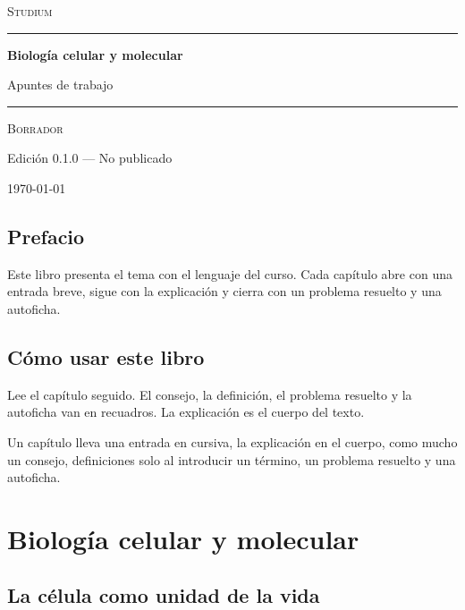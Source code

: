 \documentclass{book}
\begin{document}
\frontmatter
\ifdefined\studiumcustomtitle
\studiumcustomtitle
\else
\thispagestyle{empty}
\setlength{\parindent}{0pt}
\vspace*{0.08\textheight}
{\normalsize\scshape\color{studiumInk} Studium\par}
\vspace{0.55em}
{\color{studiumRule}\rule{\linewidth}{0.9pt}\par}
\vspace{0.16\textheight}
{\raggedright\Huge\bfseries Biología celular y molecular\par}
\vspace{0.9em}
{\raggedright\Large\color{studiumInk} Apuntes de trabajo\par}
\vfill
{\color{studiumRule}\rule{0.36\linewidth}{0.45pt}\par}
\vspace{1.05em}
{\large\scshape Borrador\par}
\vspace{0.45em}
{\normalsize Edición 0.1.0 --- No publicado\par}
\vspace{0.4em}
{\normalsize\today\par}
\vspace*{0.08\textheight}
\clearpage
\fi
\chapter{Prefacio}
\noindent Este libro presenta el tema con el lenguaje del curso. Cada capítulo abre con una entrada breve, sigue con la explicación y cierra con un problema resuelto y una autoficha.
\chapter{Cómo usar este libro}
\noindent Lee el capítulo seguido. El consejo, la definición, el problema resuelto y la autoficha van en recuadros. La explicación es el cuerpo del texto.

\noindent Un capítulo lleva una entrada en cursiva, la explicación en el cuerpo, como mucho un consejo, definiciones solo al introducir un término, un problema resuelto y una autoficha.
\tableofcontents
\mainmatter
\part{Biología celular y molecular}

\chapter{La célula como unidad de la vida}
\label{chap:bio-01}
\end{document}
